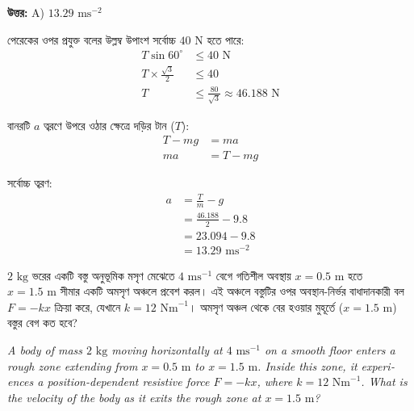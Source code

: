 \documentclass[12pt, a4paper]{article}
\begin{document}
\vspace{0.5em}
\begin{tcolorbox}[answerbox]
    \textbf{\color{success} উত্তর:} A) $13.29\text{ ms}^{-2}$
\end{tcolorbox}
\vspace{1em}

\begin{tcolorbox}[solutionbox={সমাধান (Solution)}]
    \noindent
    পেরেকের ওপর প্রযুক্ত বলের উল্লম্ব উপাংশ সর্বোচ্চ $40\text{ N}$ হতে পারে:
    \begin{align*}
        T \sin 60^\circ &\le 40\text{ N} \\
        T \times \frac{\sqrt{3}}{2} &\le 40 \\
        T &\le \frac{80}{\sqrt{3}} \approx 46.188\text{ N}
    \end{align*}
    
    বানরটি $a$ ত্বরণে উপরে ওঠার ক্ষেত্রে দড়ির টান ($T$):
    \begin{align*}
        T - mg &= ma \\
        ma &= T - mg
    \end{align*}
    
    সর্বোচ্চ ত্বরণ:
    \begin{align*}
        a &= \frac{T}{m} - g \\
          &= \frac{46.188}{2} - 9.8 \\
          &= 23.094 - 9.8 \\
          &= \mathbf{13.29}\text{ ms}^{-2}
    \end{align*}
\end{tcolorbox}

\newpage

\begin{tcolorbox}[questionbox={প্রশ্ন (Question) 20}]
    \noindent
    $2\text{ kg}$ ভরের একটি বস্তু অনুভূমিক মসৃণ মেঝেতে $4\text{ ms}^{-1}$ বেগে গতিশীল অবস্থায় $x = 0.5\text{ m}$ হতে $x = 1.5\text{ m}$ সীমার একটি অমসৃণ অঞ্চলে প্রবেশ করল। এই অঞ্চলে বস্তুটির ওপর অবস্থান-নির্ভর বাধাদানকারী বল $F = -kx$ ক্রিয়া করে, যেখানে $k = 12\text{ Nm}^{-1}$। অমসৃণ অঞ্চল থেকে বের হওয়ার মুহূর্তে ($x = 1.5\text{ m}$) বস্তুর বেগ কত হবে?
    
    \vspace{0.8em}
    \begin{english}
    \noindent\textit{\color{darkgray}
    A body of mass $2\text{ kg}$ moving horizontally at $4\text{ ms}^{-1}$ on a smooth floor enters a rough zone extending from $x = 0.5\text{ m}$ to $x = 1.5\text{ m}$. Inside this zone, it experiences a position-dependent resistive force $F = -kx$, where $k = 12\text{ Nm}^{-1}$. What is the velocity of the body as it exits the rough zone at $x = 1.5\text{ m}$?
    }
    \end{english}
\end{tcolorbox}
\end{document}
